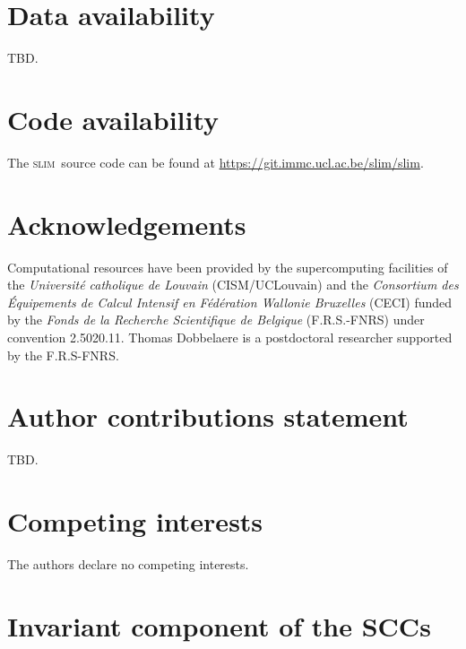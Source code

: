 \documentclass[preprint,12pt,authoryear]{elsarticle}
\newcommand{\slim}{\textsc{slim}\ }
\begin{document}
\section*{Data availability}

TBD.

\section*{Code availability}

The \slim source code can be found at \href{https://git.immc.ucl.ac.be/slim/slim}{https://git.immc.ucl.ac.be/slim/slim}.

\section*{Acknowledgements}

Computational resources have been provided by the supercomputing facilities of the \textit{Universit\'e catholique de Louvain} (CISM/UCLouvain) and the \textit{Consortium des \'Equipements de Calcul Intensif en F\'ed\'eration Wallonie Bruxelles} (CECI) funded by the \textit{Fonds de la Recherche Scientifique de Belgique} (F.R.S.-FNRS) under convention 2.5020.11. Thomas Dobbelaere is a postdoctoral researcher supported by the F.R.S-FNRS.

\section*{Author contributions statement}

TBD.

\section*{Competing interests}

The authors declare no competing interests.




\newpage
\appendix

\section{Invariant component of the SCCs}
\end{document}
